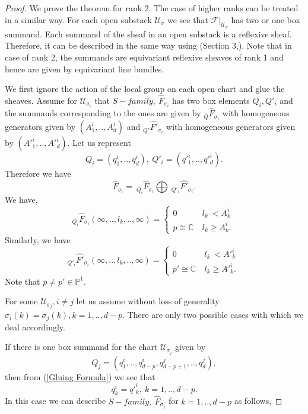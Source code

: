 \documentclass[10pt]{amsart}
\numberwithin{equation}{subsection}
\begin{document}
\begin{proof}
We prove the theorem for rank 2. The case of higher ranks can be treated in a similar way. For each open substack $\mathscr{U}_\sigma$ we see that $\mathscr{F}|_{\mathscr{U}_{\sigma}}$ has two or one box summand. Each summand of the sheaf in an open substack is a reflexive sheaf. Therefore, it can be described in the same way using (Section 3,\cite{GJK}). Note that in case of rank 2, the summands are equivariant reflexive sheaves of rank 1 and hence are given by equivariant line bundles. \par
We first ignore the action of the local group on each open chart and glue the sheaves. %
Assume for $\mathscr{U}_{\sigma_i}$ that $S-family,\ \hat{F}_{\sigma_i}$ has two box elements $Q_i,Q'_i$ and the summands corresponding to the ones are given by $_{Q}\hat{F}_{\sigma_i}$ with homogeneous generators given by $(A^i_1,..,A^i_d)$ and $_{Q'}\hat{F'}_{\sigma_i}$ with homogeneous generators given by $(A'^i_1,..,A'^i_d).$ 
Let us represent $$Q_i=(q^i_1,..,q^i_d),\ Q'_i=(q'^i_1,..,q'^i_d).$$ Therefore we have $$\hat{F}_{\sigma_i}=\ _{Q_i}\hat{F}_{\sigma_i}\bigoplus\ _{Q'_i}\hat{F'}_{\sigma_i}.$$
We have, 
$$_{Q_i}\hat{F}_{\sigma_i}(\infty,..,l_k,..,\infty) = \left\{ 
\begin{array}{ll}
0 & \ l_k\ <  A^i_k \ \\
p \cong \mathbb{C} & \ l_k\geq A^i_k.\
\end{array}
\right.$$
Similarly, we have
$$_{Q'_i}\hat{F'}_{\sigma_i}(\infty,..,l_k,..,\infty) =\left\{
\begin{array}{ll}
0 & \ l_k\ <  A'^i_k \ \\[2ex]
p' \cong \mathbb{C} & \ l_k\geq A'^i_k.\ 
\end{array}
\right.$$ Note that $p\neq p' \in \mathbb{P}^1.$\par
For some $\mathscr{U}_{\sigma_j},i\neq j$ let us assume without loss of generality $\sigma_i(k)=\sigma_j(k), k=1,..,d-p.$ There are only two possible cases with which we deal accordingly. \par If there is one box summand for the chart $\mathscr{U}_{\sigma_j}$ given by $$Q_j=(q^i_1,..,q^i_{d-p},q^j_{d-p+1},..,q^j_{d}),$$ then from (\ref{Gluing Formula}) we see that $$q^i_k=q'^i_k,\  k=1,..,d-p.$$
In this case we can describe $S-family,\  \hat{F}_{\sigma_j}$ for $k=1,..,d-p$ as follows,

\end{proof}
\end{document}

